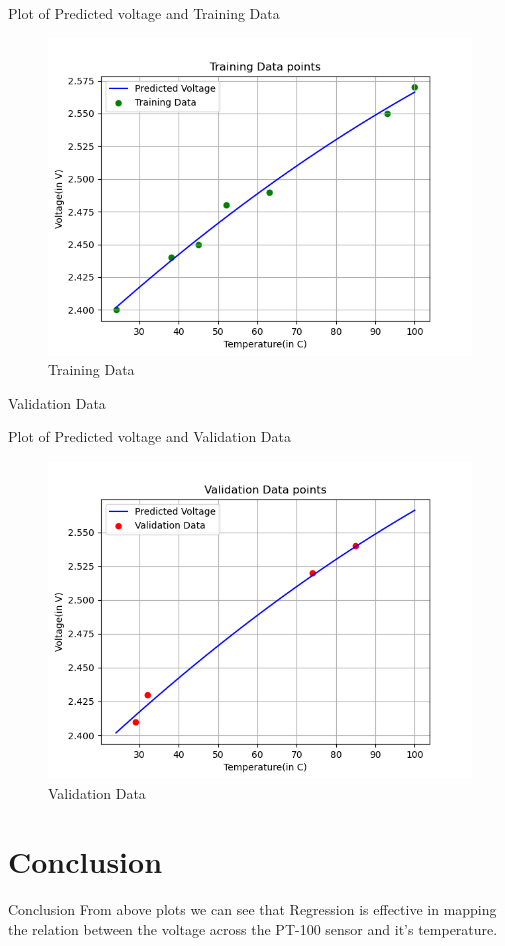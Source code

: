 \documentclass{beamer}
\theoremstyle{remark}
\begin{document}
\begin{frame}{Plot of Predicted voltage and Training Data}
	\begin{figure}[!ht]
    \centering
    \includegraphics[width=0.6\columnwidth]{figs/Training_Data.png}
    \caption{Training Data}
    \label{fig:T_Data}
	\end{figure}
\end{frame}

\begin{frame}{Validation Data}
    \begin{table}[!ht]
    	\centering
    	
    	\caption{Validation data}
    	\label{tab:valid}
	\end{table}
\end{frame}

\begin{frame}{Plot of Predicted voltage and Validation Data}
	\begin{figure}[!ht]
    \centering
    \includegraphics[width=0.6\columnwidth]{figs/Validation_Data.png}
    \caption{Validation Data}
    \label{fig:V_Data}
	\end{figure}
\end{frame}

\section{Conclusion}
\begin{frame}{Conclusion}
	From above plots we can see that Regression is effective in mapping the relation between the voltage across the PT-100 sensor and it's temperature.
\end{frame}
\end{document}
